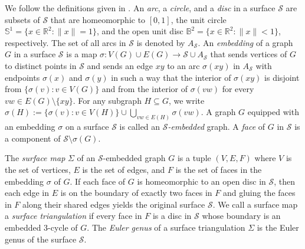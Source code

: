 \documentclass{patmorin}
\newcommand{\defin}[1]{\emph{\textcolor{brightmaroon}{#1}}}
\begin{document}
We follow the definitions given in \citet[Appendix~B]{diestel:graph}. An \defin{arc}, a \defin{circle}, and a \defin{disc} in a surface $\mathcal{S}$ are subsets of $\mathcal{S}$ that are homeomorphic to $[0, 1]$, the unit circle $\mathbb{S}^1 = \{x \in \mathbb{R}^2: \|x\| = 1\}$, and the open unit disc $\mathbb{B}^2 = \{x \in \mathbb{R}^2 : \|x\| < 1\}$, respectively.
The set of all arcs in $\mathcal{S}$ is denoted by $A_\mathcal{S}$.
An \defin{embedding} of a graph $G$ in a surface $\mathcal{S}$ is a map $\sigma: V(G)\cup E(G) \longrightarrow \mathcal{S}\cup A_\mathcal{S}$ that sends vertices of $G$ to distinct points in $\mathcal{S}$ and sends an edge $xy$ to
an arc $\sigma(xy)$ in $A_\mathcal{S}$ with endpoints $\sigma(x)$ and $\sigma(y)$ in such a way that the interior of $\sigma(xy)$ is disjoint from $\{\sigma(v):v\in V(G)\}$ and from the interior of $\sigma(vw)$ for every $vw\in E(G)\setminus\{xy\}$. For any subgraph $H\subseteq G$, we write $\sigma(H):=\{\sigma(v):v\in V(H)\}\cup \bigcup_{vw\in E(H)}\sigma(vw)$.
A graph $G$ equipped with an embedding $\sigma$ on a surface $\mathcal{S}$ is called an \defin{$\mathcal{S}$-embedded} graph. A \defin{face} of $G$ in $\mathcal{S}$ is a component of $\mathcal{S} \setminus \sigma(G)$.


The \defin{surface map} $\Sigma$ of an $\mathcal{S}$-embedded graph $G$ is a tuple $(V, E, F)$ where $V$ is the set of vertices, $E$ is the set of edges, and $F$ is the set of faces in the embedding $\sigma$ of $G$. If each face of $G$ is homeomorphic to an open disc in $\mathcal{S}$, then each edge in $E$ is on the boundary of exactly two faces in $F$ and gluing the faces in $F$ along their shared edges yields the original surface $\mathcal{S}$.  We call a surface map a \defin{surface triangulation} if every face in $F$ is a disc in $\mathcal{S}$ whose boundary is an embedded $3$-cycle of $G$.  The \defin{Euler genus} of a surface triangulation $\Sigma$ is the Euler genus of the surface $\mathcal{S}$.
\end{document}
